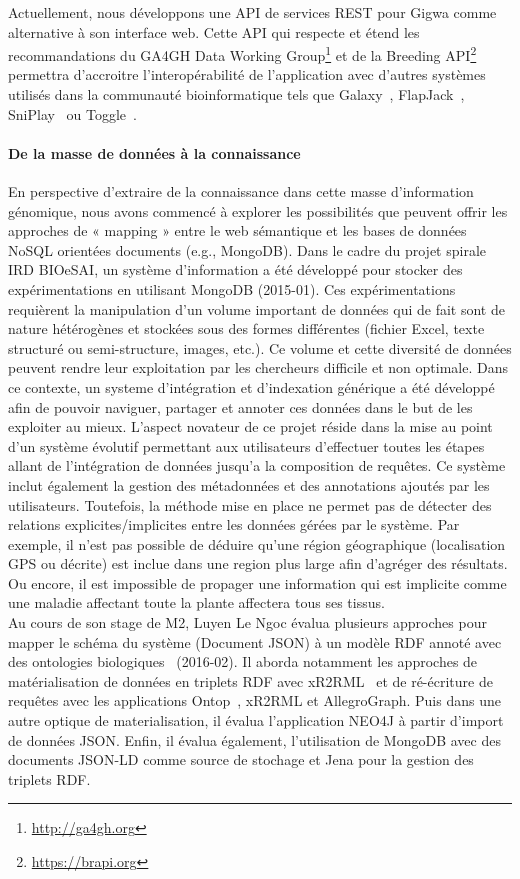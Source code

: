 Actuellement, nous développons une API de services REST pour Gigwa comme alternative à son interface web. Cette API qui respecte et étend les recommandations du GA4GH Data Working Group\footnote{\url{http://ga4gh.org}} et de la Breeding API\footnote{\url{https://brapi.org}} permettra d’accroitre l’interopérabilité de l’application avec d’autres systèmes utilisés dans la communauté bioinformatique tels que Galaxy~\cite{Giardine2005,Goecks2010}, FlapJack~\cite{Milne2010}, SniPlay~\cite{Dereeper2015} ou Toggle~\cite{Monat2015}.

\paragraph*{De la masse de données à la connaissance}
En perspective d’extraire de la connaissance dans cette masse d’information génomique, nous avons commencé à explorer les possibilités que peuvent offrir les approches de « mapping » entre le web sémantique et les bases de données NoSQL orientées documents (e.g., MongoDB). Dans le cadre du projet spirale IRD BIOeSAI, un système d’information a été développé pour stocker des expérimentations en utilisant MongoDB (2015-01). Ces expérimentations requièrent la manipulation d’un volume important de données qui de fait sont de nature hétérogènes et stockées sous des formes différentes (fichier Excel, texte structuré ou semi-structure, images, etc.). Ce volume et cette diversité de données peuvent rendre leur exploitation par les chercheurs difficile et non optimale. Dans ce contexte, un systeme d’intégration et d'indexation générique a été développé afin de pouvoir naviguer, partager et annoter ces données dans le but de les exploiter au mieux. L'aspect novateur de ce projet réside dans la mise au point d'un système évolutif permettant aux utilisateurs d’effectuer toutes les étapes allant de l’intégration de données jusqu’a la composition de requêtes. Ce système inclut également la gestion des métadonnées et des annotations ajoutés par les utilisateurs. Toutefois, la méthode mise en place ne permet pas de détecter des relations explicites/implicites entre les données gérées par le système.  Par exemple, il n’est pas possible de déduire qu’une région géographique (localisation GPS ou décrite) est inclue dans une region plus large afin d’agréger des résultats. Ou encore, il est impossible de propager une information qui est implicite comme une maladie affectant toute la plante affectera tous ses tissus. \\
Au cours de son stage de M2, Luyen Le Ngoc évalua plusieurs approches pour mapper le schéma du système (Document JSON) à un modèle RDF annoté avec des ontologies biologiques~\cite{Luyen:2016} (2016-02). Il aborda notamment les approches de matérialisation de données en triplets RDF avec xR2RML~\cite{Michel2015} et de ré-écriture de requêtes avec les applications Ontop~\cite{rodriguez}, xR2RML et AllegroGraph. Puis dans une autre optique de materialisation, il évalua l'application NEO4J à partir d'import de données JSON. Enfin, il évalua également, l'utilisation de MongoDB avec des documents JSON-LD comme source de stochage et Jena pour la gestion des triplets RDF. \\

